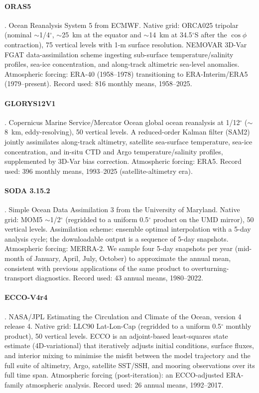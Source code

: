 \documentclass[11pt,a4paper]{article}
\begin{document}
\paragraph{ORAS5} \citep{Zuo2019}. Ocean Reanalysis System 5 from ECMWF. Native grid: ORCA025 tripolar (nominal $\sim$1/4$^\circ$, $\sim$25~km at the equator and $\sim$14~km at 34.5$^\circ$S after the $\cos\phi$ contraction), 75 vertical levels with 1-m surface resolution. NEMOVAR 3D-Var FGAT data-assimilation scheme ingesting sub-surface temperature/salinity profiles, sea-ice concentration, and along-track altimetric sea-level anomalies. Atmospheric forcing: ERA-40 (1958--1978) transitioning to ERA-Interim/ERA5 (1979--present). Record used: 816 monthly means, 1958--2025.

\paragraph{GLORYS12V1} \citep{Lellouche2021}. Copernicus Marine Service/Mercator Ocean global ocean reanalysis at 1/12$^\circ$ ($\sim$8~km, eddy-resolving), 50 vertical levels. A reduced-order Kalman filter (SAM2) jointly assimilates along-track altimetry, satellite sea-surface temperature, sea-ice concentration, and in-situ CTD and Argo temperature/salinity profiles, supplemented by 3D-Var bias correction. Atmospheric forcing: ERA5. Record used: 396 monthly means, 1993--2025 (satellite-altimetry era).

\paragraph{SODA 3.15.2} \citep{Carton2018}. Simple Ocean Data Assimilation 3 from the University of Maryland. Native grid: MOM5 $\sim$1/2$^\circ$ (regridded to a uniform 0.5$^\circ$ product on the UMD mirror), 50 vertical levels. Assimilation scheme: ensemble optimal interpolation with a 5-day analysis cycle; the downloadable output is a sequence of 5-day snapshots. Atmospheric forcing: MERRA-2. We sample four 5-day snapshots per year (mid-month of January, April, July, October) to approximate the annual mean, consistent with previous applications of the same product to overturning-transport diagnostics. Record used: 43 annual means, 1980--2022.

\paragraph{ECCO-V4r4} \citep{Forget2015}. NASA/JPL Estimating the Circulation and Climate of the Ocean, version 4 release 4. Native grid: LLC90 Lat-Lon-Cap (regridded to a uniform 0.5$^\circ$ monthly product), 50 vertical levels. ECCO is an adjoint-based least-squares state estimate (4D-variational) that iteratively adjusts initial conditions, surface fluxes, and interior mixing to minimise the misfit between the model trajectory and the full suite of altimetry, Argo, satellite SST/SSH, and mooring observations over its full time span. Atmospheric forcing (post-iteration): an ECCO-adjusted ERA-family atmospheric analysis. Record used: 26 annual means, 1992--2017.
\end{document}

